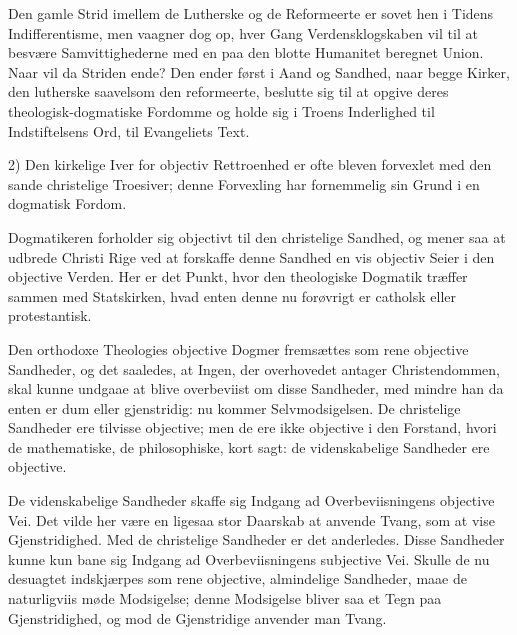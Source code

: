 \documentclass[12pt,a4paper]{book}
\newcommand{\opage}[1]{\marginnote{\footnotesize\textit{[#1]}}}
\begin{document}
Den gamle Strid imellem de Lutherske og de Reformeerte er sovet hen i Tidens
Indifferentisme, men vaagner dog op, hver Gang Verdensklogskaben vil til at
besvære Samvittighederne med en paa den blotte Humanitet beregnet Union. Naar
vil da Striden ende? Den ender først i Aand og Sandhed, naar begge Kirker, den
lutherske saavelsom den reformeerte, beslutte sig til at opgive deres
theologisk-dogmatiske Fordomme og holde sig i Troens Inderlighed til
Indstiftelsens Ord, til Evangeliets Text.

2) Den kirkelige Iver for objectiv Rettroenhed er ofte bleven forvexlet med
den sande christelige Troesiver; denne Forvexling har fornemmelig sin Grund i
en dogmatisk Fordom.

Dogmatikeren forholder sig objectivt til den christelige Sandhed, og mener saa
at udbrede Christi Rige ved at forskaffe denne Sandhed en vis objectiv Seier i
den objective Verden. Her er det Punkt, hvor den theologiske Dogmatik træffer
sammen med Statskirken, hvad enten denne nu forøvrigt er catholsk eller
protestantisk.

Den orthodoxe Theologies objective Dogmer fremsættes som rene objective
Sandheder, og det saaledes, at Ingen, der overhovedet antager Christendommen,
skal kunne undgaae at blive overbeviist om disse Sandheder, med mindre han da
enten er dum eller gjenstridig: nu kommer Selvmodsigelsen. De christelige
Sandheder ere tilvisse objective; men de ere ikke objective i den Forstand,
hvori de mathematiske, de philosophiske, kort sagt: de videnskabelige Sandheder
ere objective.

De videnskabelige Sandheder skaffe sig Indgang ad Overbeviisningens objective
Vei. Det vilde her være en ligesaa stor Daarskab at anvende Tvang, som at vise
Gjenstridighed. Med de christelige Sandheder er det anderledes. Disse Sandheder
kunne kun bane sig Indgang ad Overbeviisningens subjective
\opage{119} Vei. Skulle de nu desuagtet indskjærpes som rene objective, almindelige
Sandheder, maae de naturligviis møde Modsigelse; denne Modsigelse bliver saa et
Tegn paa Gjenstridighed, og mod de Gjenstridige anvender man Tvang.
\end{document}
